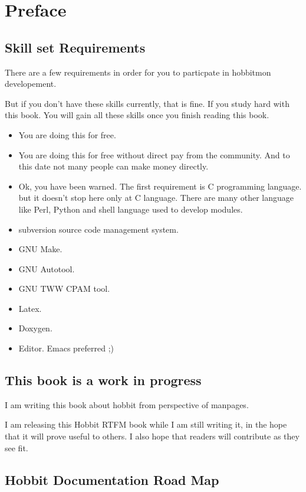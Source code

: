 \chapter{Preface}
\label{chap:preface}



\section{Skill set  Requirements }
There are a few requirements in order for you to particpate in
hobbitmon developement.

But if you don't have these skills currently, that is fine. If you
study hard with this book. You will gain all these skills once you
finish reading this book.


\begin{itemize}
\item You are doing this for free.
\item You are doing this for free without direct pay from the
  community. And to this date not many people can make money directly.

\item Ok, you have been warned. The first requirement is C programming
  language. but it doesn't stop here only at C language. There are
  many other language like Perl, Python and shell language used to
  develop modules. 
\item subversion source code management system.
\item GNU Make.
\item GNU Autotool.
\item GNU TWW CPAM tool.
\item Latex.
\item Doxygen.
\item Editor. Emacs preferred ;)
 
\end{itemize}

\section{This book is a work in progress}

I am writing this  book about hobbit from perspective of manpages.  

I am releasing this Hobbit RTFM book while I am still writing it, in the hope that
it will prove useful to others.  I also hope that readers will contribute as they see fit.

\section{Hobbit Documentation Road Map}


